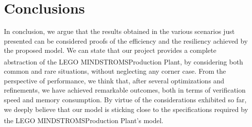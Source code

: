 \documentclass[a4paper]{article}
\begin{document}
    \section{Conclusions}

    In conclusion, we argue that the results obtained in the various scenarios just presented can be considered proofs of the efficiency and the resiliency achieved by the proposed model. We can state that our project provides a complete abstraction of the LEGO\textsuperscript{\textregistered} MINDSTROMS\texttrademark Production Plant, by considering both common and rare situations, without neglecting any corner case. From the perspective of performance, we think that, after several optimizations and refinements, we have achieved remarkable outcomes, both in terms of verification speed and memory consumption. By virtue of the considerations exhibited so far, we deeply believe that our model is sticking close to the specifications required by the LEGO\textsuperscript{\textregistered} MINDSTROMS\texttrademark Production Plant's model.
\end{document}
